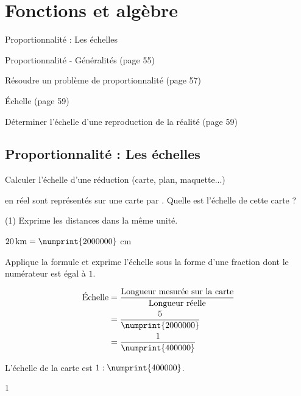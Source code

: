 \documentclass[a4paper,11pt]{report}
\begin{document}
\newcommand{\chapterName}{Fonctions et algèbre}
\newcommand{\serieName}{Proportionnalité : Les échelles}

\chapter*{\chapterName}
\thispagestyle{empty}

\begin{amL}{\serieName}{
\item Proportionnalité - Généralités (page 55)
\item Résoudre un problème de proportionnalité (page 57)
\item Échelle (page 59)
\item Déterminer l'échelle d'une reproduction de la réalité (page 59)
}\end{amL}

\section*{\serieName}
\setcounter{page}{1}



\begin{resolu}{Calculer l'échelle d'une réduction (carte, plan, maquette...)}{
 en réel sont représentés sur une carte par . Quelle est l'échelle de cette carte ?

\begin{tasks}(1)
    \task Exprime les distances dans la même unité.

    $\tunit{20}{\kilo m} = \numprint{2000000}$ cm

    \task Applique la formule et exprime l'échelle sous la forme d'une fraction dont le numérateur est égal à $1$.
    
    \begin{align*}        \textrm{Échelle}&=\dfrac{\textrm{Longueur mesurée sur la carte}}{\textrm{Longueur réelle}} \\
    &=\dfrac{5}{\numprint{2000000}} \\
    &=\dfrac{1}{\numprint{400000}} 
    \end{align*}
    
    \task L'échelle de la carte est $1:\numprint{400000}$.
\end{tasks}
}{1}    
\end{resolu}
\end{document}
